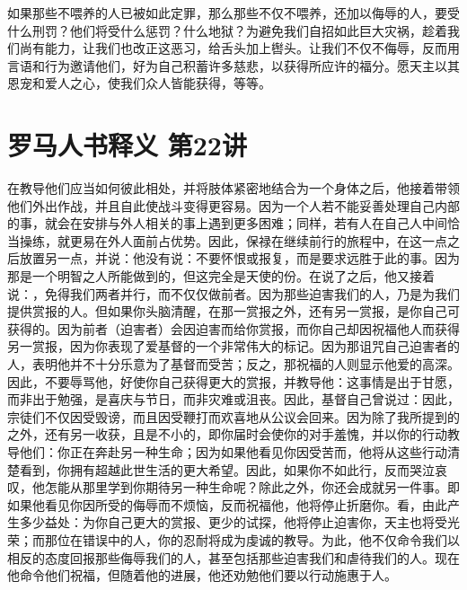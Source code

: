 如果那些不喂养的人已被如此定罪，那么那些不仅不喂养，还加以侮辱的人，要受什么刑罚？他们将受什么惩罚？什么地狱？为避免我们自招如此巨大灾祸，趁着我们尚有能力，让我们也改正这恶习，给舌头加上辔头。让我们不仅不侮辱，反而用言语和行为邀请他们，好为自己积蓄许多慈悲，以获得所应许的福分。愿天主以其恩宠和爱人之心，使我们众人皆能获得，等等。\par



\section{罗马人书释义 第22讲}

\par

\par

在教导他们应当如何彼此相处，并将肢体紧密地结合为一个身体之后，他接着带领他们外出作战，并且自此使战斗变得更容易。因为一个人若不能妥善处理自己内部的事，就会在安排与外人相关的事上遇到更多困难；同样，若有人在自己人中间恰当操练，就更易在外人面前占优势。因此，保禄在继续前行的旅程中，在这一点之后放置另一点，并说：他没有说：不要怀恨或报复，而是要求远胜于此的事。因为那是一个明智之人所能做到的，但这完全是天使的份。在说了之后，他又接着说：，免得我们两者并行，而不仅仅做前者。因为那些迫害我们的人，乃是为我们提供赏报的人。但如果你头脑清醒，在那一赏报之外，还有另一赏报，是你自己可获得的。因为前者（迫害者）会因迫害而给你赏报，而你自己却因祝福他人而获得另一赏报，因为你表现了爱基督的一个非常伟大的标记。因为那诅咒自己迫害者的人，表明他并不十分乐意为了基督而受苦；反之，那祝福的人则显示他爱的高深。因此，不要辱骂他，好使你自己获得更大的赏报，并教导他：这事情是出于甘愿，而非出于勉强，是喜庆与节日，而非灾难或沮丧。因此，基督自己曾说过：因此，宗徒们不仅因受毁谤，而且因受鞭打而欢喜地从公议会回来。因为除了我所提到的之外，还有另一收获，且是不小的，即你届时会使你的对手羞愧，并以你的行动教导他们：你正在奔赴另一种生命；因为如果他看见你因受苦而，他将从这些行动清楚看到，你拥有超越此世生活的更大希望。因此，如果你不如此行，反而哭泣哀叹，他怎能从那里学到你期待另一种生命呢？除此之外，你还会成就另一件事。即如果他看见你因所受的侮辱而不烦恼，反而祝福他，他将停止折磨你。看，由此产生多少益处：为你自己更大的赏报、更少的试探，他将停止迫害你，天主也将受光荣；而那位在错误中的人，你的忍耐将成为虔诚的教导。为此，他不仅命令我们以相反的态度回报那些侮辱我们的人，甚至包括那些迫害我们和虐待我们的人。现在他命令他们祝福，但随着他的进展，他还劝勉他们要以行动施惠于人。\par

